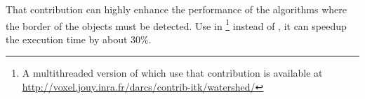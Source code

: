 \documentclass{InsightArticle}
\begin{document}
That contribution can highly enhance the performance of the algorithms where the border of the objects must be detected. Use in \footnote{A multithreaded version of  which use that contribution is available at \url{http://voxel.jouy.inra.fr/darcs/contrib-itk/watershed/}} instead of , it can speedup the execution time by about 30\%.








\appendix





\end{document}
